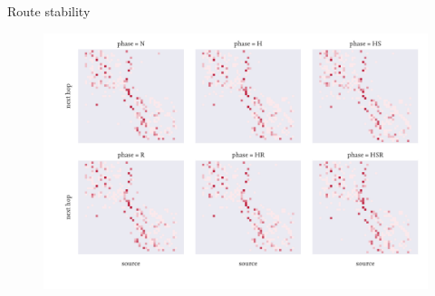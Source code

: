 \documentclass[fleqn,11pt,aspectratio=1610]{beamer}
\begin{document}
\begin{frame}{Route stability}
  \begin{figure}
    \centering
    \includegraphics[height=\textheight]{../images/routes.pdf}
  \end{figure}
\end{frame}
\end{document}
